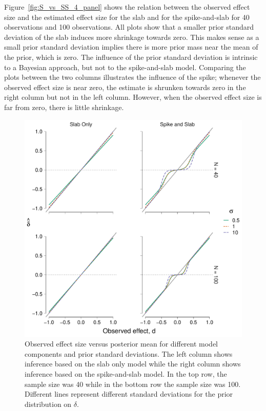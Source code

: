 \documentclass[a4paper]{article}
\newenvironment{revision}{\color{teal}}{\color{black}}
\begin{document}
\begin{revision}
Figure~\ref{fig:S_vs_SS_4_panel} shows the relation between the observed effect size and the estimated effect size for the slab and for the spike-and-slab for 40 observations and 100 observations.
All plots show that a smaller prior standard deviation of the slab induces more shrinkage towards zero.
This makes sense as a small prior standard deviation implies there is more prior mass near the mean of the prior, which is zero.
The influence of the prior standard deviation is intrinsic to a Bayesian approach, but not to the spike-and-slab model.
Comparing the plots between the two columns illustrates the influence of the spike; whenever the observed effect size is near zero, the estimate is shrunken towards zero in the right column but not in the left column.
However, when the observed effect size is far from zero, there is little shrinkage.
\begin{figure}[!ht]
	\includegraphics[width=\textwidth]{posteriorMeanVsSampleDelta_4_panel_big_font.pdf}
	\caption{%
		Observed effect size versus posterior mean for different model components and prior standard deviations.
		The left column shows inference based on the slab only model while the right column shows inference based on the spike-and-slab model.
		In the top row, the sample size was 40 while in the bottom row the sample size was 100.
		Different lines represent different standard deviations for the prior distribution on $\delta$.
}
\end{figure}
\end{revision}
\end{document}

